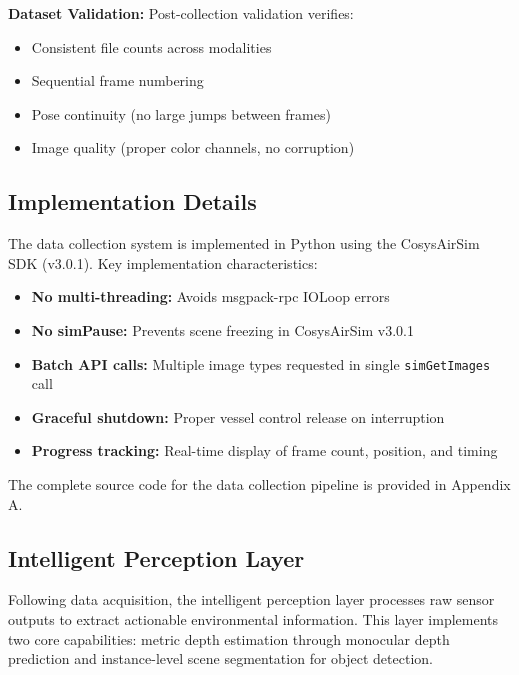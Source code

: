 \textbf{Dataset Validation:} Post-collection validation verifies:

\begin{itemize}
    \item Consistent file counts across modalities
    \item Sequential frame numbering
    \item Pose continuity (no large jumps between frames)
    \item Image quality (proper color channels, no corruption)
\end{itemize}

\subsection{Implementation Details}

The data collection system is implemented in Python using the CosysAirSim SDK (v3.0.1). Key implementation characteristics:

\begin{itemize}
    \item \textbf{No multi-threading:} Avoids msgpack-rpc IOLoop errors
    \item \textbf{No simPause:} Prevents scene freezing in CosysAirSim v3.0.1
    \item \textbf{Batch API calls:} Multiple image types requested in single \texttt{simGetImages} call
    \item \textbf{Graceful shutdown:} Proper vessel control release on interruption
    \item \textbf{Progress tracking:} Real-time display of frame count, position, and timing
\end{itemize}

The complete source code for the data collection pipeline is provided in Appendix A.

\subsection{Intelligent Perception Layer}

Following data acquisition, the intelligent perception layer processes raw sensor outputs to extract actionable environmental information. This layer implements two core capabilities: metric depth estimation through monocular depth prediction and instance-level scene segmentation for object detection.

